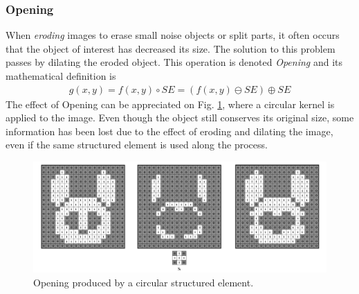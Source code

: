 \subsubsection{Opening}
When \textit{eroding} images to erase small noise objects or split parts, it often occurs that the object of interest has decreased its size. The solution to this problem passes by dilating the eroded object. This operation is denoted \textit{Opening} and its mathematical definition is
\begin{equation}
\begin{aligned}
{g(x,y)}={f(x,y)}\circ{SE}=({f(x,y)}\ominus{SE})\oplus{SE}
\label{Opening}
	\end{aligned}
\end{equation}
The effect of Opening can be appreciated on Fig. \ref{fig:Opening}, where a circular kernel is applied to the image. Even though the object still conserves its original size, some information has been lost due to the effect of eroding and dilating the image, even if the same structured element is used along the process.

\begin{figure}[htbp]
\centering
\includegraphics[width=1\textwidth]{Pictures/Theory/OpeningCirc.png}
\caption{Opening produced by a circular structured element.}
\label{fig:Opening}
\end{figure}

